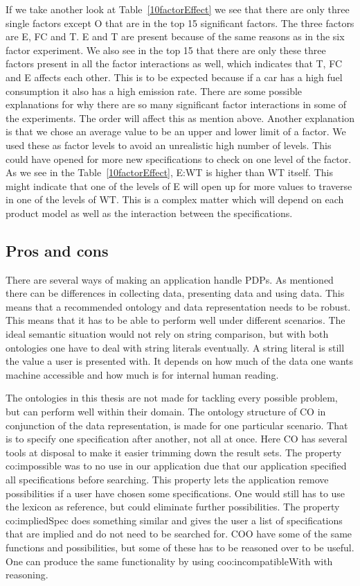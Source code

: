 \documentclass{llncs}
\begin{document}
If we take another look at Table~\ref{10factorEffect} we see that
there are only three single factors except O that are in the top 15
significant factors. The three factors are E, FC and T. E and T
are present because of the same reasons as in the six factor
experiment. We also see in the top 15 that there are only these three
factors present in all the factor interactions as well, which
indicates that T, FC and E affects each other. This is to be expected
because if a car has a high fuel consumption it also has a high
emission rate. There are some possible explanations for why there are
so many significant factor interactions in some of the
experiments. The order will affect this as mention above. Another
explanation is that we chose an average value to be an upper and lower
limit of a factor. We used these as factor levels to avoid an
unrealistic high number of levels. This could have opened for more new
specifications to check on one level of the factor.  As we see in the
Table~\ref{10factorEffect}, \textsf{E:WT} is higher than \textsf{WT}
itself. This might indicate that one of the levels of E will open up
for more values to traverse in one of the levels of WT. This is a
complex matter which will depend on each product model as well as the
interaction between the specifications.

\subsection{Pros and cons}
There are several ways of making an application handle PDPs. As
mentioned there can be differences in collecting data, presenting data
and using data. This means that a recommended ontology and data
representation needs to be robust. This means that it has to be able
to perform well under different scenarios.  The ideal semantic
situation would not rely on string comparison, but with both
ontologies one have to deal with string literals eventually. A string
literal is still the value a user is presented with.  It depends on
how much of the data one wants machine accessible and how much is for
internal human reading.

The ontologies in this thesis are not made for tackling every possible
problem, but can perform well within their domain. The ontology
structure of CO in conjunction of the data representation, is made for
one particular scenario. That is to specify one specification after
another, not all at once. Here CO has several tools at disposal to
make it easier trimming down the result sets. The property
\textsf{co:impossible} was to no use in our application due that our
application specified all specifications before searching. This
property lets the application remove possibilities if a user have
chosen some specifications. One would still has to use the lexicon as
reference, but could eliminate further possibilities. The property
\textsf{co:impliedSpec} does something similar and gives the user a
list of specifications that are implied and do not need to be searched
for.  COO have some of the same functions and possibilities, but some
of these has to be reasoned over to be useful. One can produce the
same functionality by using \textsf{coo:incompatibleWith} with
reasoning.
\end{document}
